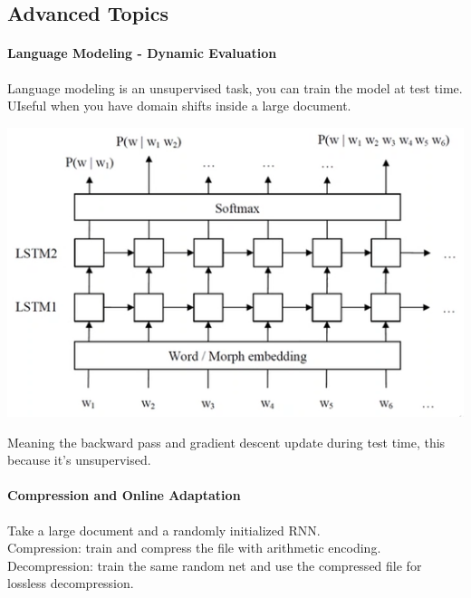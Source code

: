 \documentclass[10pt]{report}
\begin{document}
\subsection{Advanced Topics} 
\paragraph{Language Modeling - Dynamic Evaluation} Language modeling is an unsupervised task, you can train the model at test time. UIseful when you have domain shifts inside a large document.
\begin{center}
	\includegraphics[scale=0.5]{105.png}
\end{center}
Meaning the backward pass and gradient descent update during test time, this because it's unsupervised.
\paragraph{Compression and Online Adaptation} Take a large document and a randomly initialized RNN.\\
Compression: train and compress the file with arithmetic encoding.\\
Decompression: train the same random net and use the compressed file for lossless decompression.
\end{document}

